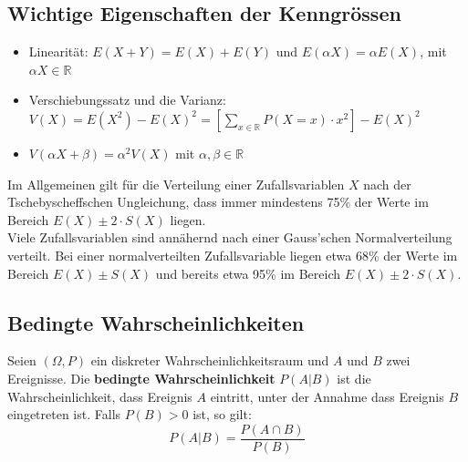 \subsection{Wichtige Eigenschaften der Kenngrössen}
\label{sec:wichtige-eigenschaften-der-kenngrssen}
\begin{itemize}
    \item Linearität: $E(X + Y) = E(X) + E(Y)$ und $E(\alpha X) = \alpha E(X)$, mit $\alpha X \in \mathbb{R}$
    \item Verschiebungssatz und die Varianz: $V(X) = E(X^2) - E(X)^2 = \left[\sum_{x \in \mathbb{R}} P(X=x) \cdot x^2\right] - E(X)^2$
    \item $V(\alpha X + \beta) = \alpha^2 V(X)$ mit $\alpha, \beta \in \mathbb{R}$
\end{itemize}
Im Allgemeinen gilt für die Verteilung einer Zufallsvariablen $X$ nach der Tschebyscheffschen Ungleichung, dass immer
mindestens 75\% der Werte im Bereich $E(X) \pm 2 \cdot S(X)$ liegen. \\
Viele Zufallsvariablen sind annähernd nach einer Gauss'schen Normalverteilung verteilt. Bei einer normalverteilten
Zufallsvariable liegen etwa 68\% der Werte im Bereich $E(X) \pm S(X)$ und bereits etwa 95\% im Bereich $E(X) \pm 2 \cdot S(X)$.
\subsection{Bedingte Wahrscheinlichkeiten}
\label{sec:bedingte-wahrscheinlichkeiten}
Seien $(\Omega, P)$ ein diskreter Wahrscheinlichkeitsraum und $A$ und $B$ zwei Ereignisse.
Die \textbf{bedingte Wahrscheinlichkeit} $P(A|B)$ ist die Wahrscheinlichkeit, dass Ereignis $A$ eintritt, unter der Annahme
dass Ereignis $B$ eingetreten ist. Falls $P(B) > 0$ ist, so gilt:
\begin{equation*}
    P(A|B) = \frac{P(A \cap B)}{P(B)}
\end{equation*}
